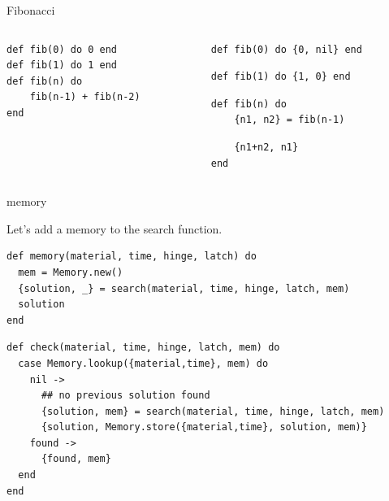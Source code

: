 \begin{frame}[fragile]{Fibonacci}

\begin{columns}
 \begin{column}{0.5\linewidth}
\begin{verbatim}
def fib(0) do 0 end
def fib(1) do 1 end
def fib(n) do
    fib(n-1) + fib(n-2)
end
\end{verbatim}
 \end {column}
\pause
 \begin{column}{0.5\linewidth}
\begin{verbatim}
def fib(0) do {0, nil} end
\end{verbatim}
\pause
\begin{verbatim}
def fib(1) do {1, 0} end
\end{verbatim}
\pause
\begin{verbatim}
def fib(n) do
    {n1, n2} = fib(n-1)
\end{verbatim}
\pause
\begin{verbatim}
    {n1+n2, n1}
end
\end{verbatim}
 \end {column}
\end{columns}

\end{frame}

\begin{frame}[fragile]{memory}

Let's add a memory to the search function.

\begin{verbatim}
def memory(material, time, hinge, latch) do
  mem = Memory.new()
  {solution, _} = search(material, time, hinge, latch, mem)
  solution
end
\end{verbatim}\pause

\begin{verbatim}
def check(material, time, hinge, latch, mem) do
  case Memory.lookup({material,time}, mem) do
    nil ->
      ## no previous solution found
      {solution, mem} = search(material, time, hinge, latch, mem)
      {solution, Memory.store({material,time}, solution, mem)}
    found ->
      {found, mem}
  end
end
\end{verbatim}

\end{frame}


